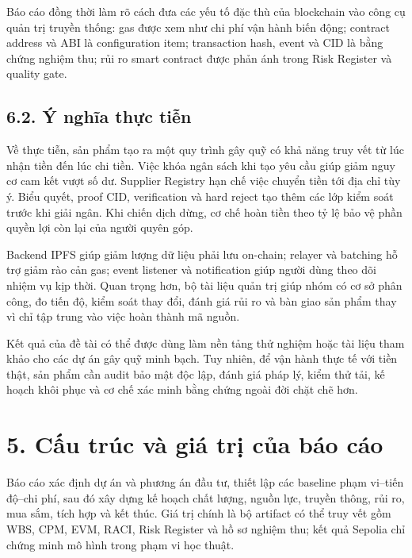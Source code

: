 Báo cáo đồng thời làm rõ cách đưa các yếu tố đặc thù của blockchain vào công cụ quản trị truyền thống: gas được xem như chi phí vận hành biến động; contract address và ABI là configuration item; transaction hash, event và CID là bằng chứng nghiệm thu; rủi ro smart contract được phản ánh trong Risk Register và quality gate.

\subsection*{6.2. Ý nghĩa thực tiễn}

Về thực tiễn, sản phẩm tạo ra một quy trình gây quỹ có khả năng truy vết từ lúc nhận tiền đến lúc chi tiền. Việc khóa ngân sách khi tạo yêu cầu giúp giảm nguy cơ cam kết vượt số dư. Supplier Registry hạn chế việc chuyển tiền tới địa chỉ tùy ý. Biểu quyết, proof CID, verification và hard reject tạo thêm các lớp kiểm soát trước khi giải ngân. Khi chiến dịch dừng, cơ chế hoàn tiền theo tỷ lệ bảo vệ phần quyền lợi còn lại của người quyên góp.

Backend IPFS giúp giảm lượng dữ liệu phải lưu on-chain; relayer và batching hỗ trợ giảm rào cản gas; event listener và notification giúp người dùng theo dõi nhiệm vụ kịp thời. Quan trọng hơn, bộ tài liệu quản trị giúp nhóm có cơ sở phân công, đo tiến độ, kiểm soát thay đổi, đánh giá rủi ro và bàn giao sản phẩm thay vì chỉ tập trung vào việc hoàn thành mã nguồn.

Kết quả của đề tài có thể được dùng làm nền tảng thử nghiệm hoặc tài liệu tham khảo cho các dự án gây quỹ minh bạch. Tuy nhiên, để vận hành thực tế với tiền thật, sản phẩm cần audit bảo mật độc lập, đánh giá pháp lý, kiểm thử tải, kế hoạch khôi phục và cơ chế xác minh bằng chứng ngoài đời chặt chẽ hơn.
\fi

\section*{5. Cấu trúc và giá trị của báo cáo}

Báo cáo xác định dự án và phương án đầu tư, thiết lập các baseline phạm vi--tiến độ--chi phí, sau đó xây dựng kế hoạch chất lượng, nguồn lực, truyền thông, rủi ro, mua sắm, tích hợp và kết thúc. Giá trị chính là bộ artifact có thể truy vết gồm WBS, CPM, EVM, RACI, Risk Register và hồ sơ nghiệm thu; kết quả Sepolia chỉ chứng minh mô hình trong phạm vi học thuật.
